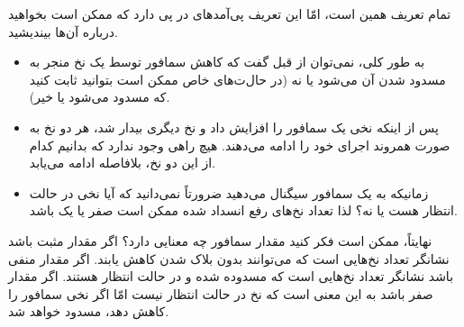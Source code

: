 \documentclass{book}
\begin{document}
    تمام تعریف همین است،‌  
    امّا این تعریف پی‌آمدهای در پی دارد که ممکن است بخواهید درباره آن‌ها بیندیشید. 

\begin{itemize}

\item 
    به طور کلی، نمی‌توان از قبل گفت که کاهش سمافور توسط یک نخ منجر به مسدود شدن آن می‌شود یا نه 
    (در حال‌ت‌های خاص ممکن است بتوانید ثابت کنید که مسدود می‌شود یا خیر).


\item 
    پس از اینکه نخی یک سمافور را افزایش داد و نخ دیگری بیدار شد، هر دو نخ به صورت همروند اجرای خود را ادامه می‌دهند. 
    هیچ راهی وجود ندارد که بدانیم کدام از این دو نخ، بلافاصله ادامه می‌یابد. 

\item 
    زمانیکه به یک سمافور سیگنال می‌دهید ضرورتاً نمی‌دانید که آیا نخی در حالت انتظار هست یا نه؟ لذا تعداد نخ‌های رفع انسداد شده ممکن است 
    صفر یا یک باشد. 

\end{itemize}

    نهایتاً، ممکن است فکر کنید مقدار سمافور چه معنایی دارد؟ %
    اگر مقدار مثبت باشد نشانگر تعداد نخ‌هایی است که می‌توانند بدون بلاک شدن کاهش یابند. 
    اگر مقدار منفی باشد نشانگر تعداد نخ‌هایی است که مسدوده شده و در حالت انتظار هستند. 
    اگر مقدار صفر باشد به این معنی است که نخ در حالت انتظار نیست امّا اگر نخی سمافور را کاهش دهد، مسدود خواهد شد.
    
\end{document}
